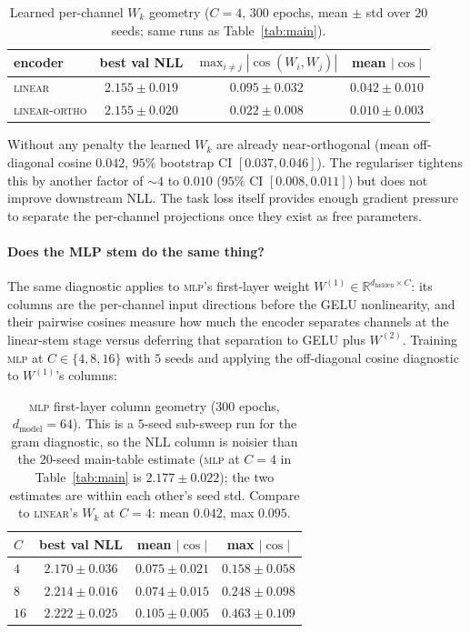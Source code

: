 \documentclass[11pt]{article}
\begin{document}
\begin{table}[h]
\centering
\caption{Learned per-channel $W_k$ geometry ($C{=}4$, $300$ epochs,
mean $\pm$ std over $20$ seeds; same runs as Table~\ref{tab:main}).}
\label{tab:gram}
\begin{tabular}{lccc}
\toprule
encoder      & best val NLL & $\max_{i\ne j}|\cos(W_i,W_j)|$ & mean $|\cos|$ \\
\midrule
\textsc{linear}      & $2.155 \pm 0.019$ & $0.095 \pm 0.032$ & $0.042 \pm 0.010$ \\
\textsc{linear-ortho} & $2.155 \pm 0.020$ & $0.022 \pm 0.008$ & $0.010 \pm 0.003$ \\
\bottomrule
\end{tabular}
\end{table}

Without any penalty the learned $W_k$ are already near-orthogonal (mean
off-diagonal cosine $0.042$, $95\%$ bootstrap CI $[0.037, 0.046]$). The
regulariser tightens this by another factor of ${\sim}4$ to $0.010$
($95\%$ CI $[0.008, 0.011]$) but does not improve downstream NLL.
The task loss itself provides enough gradient pressure to separate the
per-channel projections once they exist as free parameters.

\paragraph{Does the MLP stem do the same thing?}
The same diagnostic applies to \textsc{mlp}'s first-layer weight
$W^{(1)} \in \mathbb{R}^{d_{\text{hidden}} \times C}$: its columns are
the per-channel input directions before the GELU nonlinearity, and
their pairwise cosines measure how much the encoder separates
channels at the linear-stem stage versus deferring that separation
to GELU plus $W^{(2)}$. Training \textsc{mlp} at $C \in \{4, 8, 16\}$
with $5$ seeds and applying the off-diagonal cosine diagnostic to
$W^{(1)}$'s columns:

\begin{table}[h]
\centering
\caption{\textsc{mlp} first-layer column geometry ($300$ epochs,
$d_{\text{model}}{=}64$). This is a $5$-seed sub-sweep run for the
gram diagnostic, so the NLL column is noisier than the $20$-seed
main-table estimate (\textsc{mlp} at $C{=}4$ in Table~\ref{tab:main}
is $2.177 \pm 0.022$); the two estimates are within each other's
seed std. Compare to \textsc{linear}'s $W_k$ at $C{=}4$:
mean $0.042$, max $0.095$.}
\label{tab:mlp-gram}
\begin{tabular}{lccc}
\toprule
$C$  & best val NLL & mean $|\cos|$ & max $|\cos|$ \\
\midrule
$4$  & $2.170 \pm 0.036$ & $0.075 \pm 0.021$ & $0.158 \pm 0.058$ \\
$8$  & $2.214 \pm 0.016$ & $0.074 \pm 0.015$ & $0.248 \pm 0.098$ \\
$16$ & $2.222 \pm 0.025$ & $0.105 \pm 0.005$ & $0.463 \pm 0.109$ \\
\bottomrule
\end{tabular}
\end{table}
\end{document}
